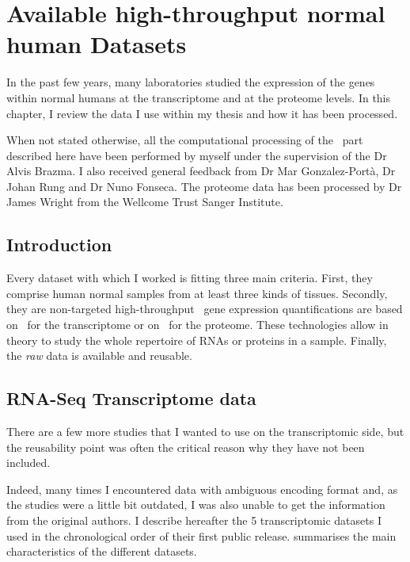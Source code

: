 \chapter{Available high-throughput normal human Datasets}
\label{ch:datasets}

\begin{comment}
\setlength{\epigraphwidth}{0.57\textwidth}
\setlength{\epigraphrule}{0.1pt}
\epigraph{Data! Data! Data! I can’t make bricks without clay!}{Sherlock Homes
    (Sir Arthur Conan Doyle)}
\end{comment}

In the past few years, many laboratories studied the expression
of the genes within normal humans at the transcriptome and at
the proteome levels. In this chapter, I review the data I use within my thesis
and how it has been processed.

When not stated otherwise, all the computational processing of the \Rnaseq\ part
described here have been performed by myself under the supervision of
the Dr Alvis Brazma. I also received general feedback from Dr Mar Gonzalez-Portà,
Dr Johan Rung and Dr Nuno Fonseca. The proteome data has been processed by
Dr James Wright from the Wellcome Trust Sanger Institute.


\section{Introduction}

Every dataset with which I worked is fitting three main criteria.
First, they comprise human normal samples from at least three kinds of tissues.
Secondly, they are non-targeted high-throughput \ie\ gene expression
quantifications are based on \Rnaseq\ for the transcriptome or on \ms\ for the
proteome. These technologies allow in theory to study the whole repertoire of
\glspl{RNA} or proteins in a sample.
Finally, the \emph{raw} data is available and reusable.


\section{RNA-Seq Transcriptome data}

There are a few more studies that I wanted to use on the
transcriptomic side, but the reusability point was often the critical reason
why they have not been included.

Indeed, many times I encountered data with ambiguous encoding format
and, as the studies were a little bit outdated,
I was also unable to get the information from the original authors.
I describe hereafter the 5 transcriptomic datasets I used
in the chronological order of their first public release.
 summarises the main characteristics of the different
datasets.

